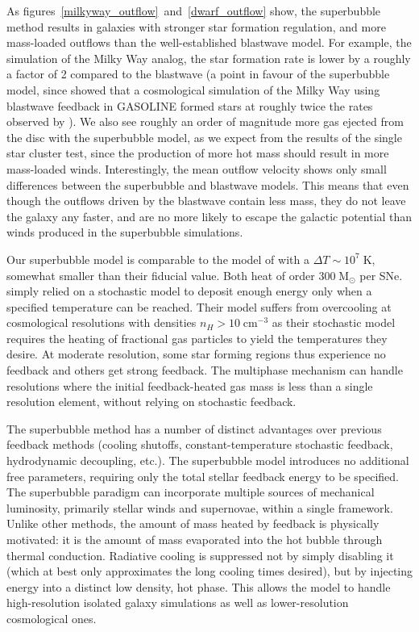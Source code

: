 As figures~\ref{milkyway_outflow}~and~\ref{dwarf_outflow} show, the superbubble
method results in galaxies with stronger star formation regulation, and
more mass-loaded outflows than the well-established blastwave model.  
For example, the simulation of the Milky Way analog, the star
formation rate is lower by a roughly a factor of 2 compared to the blastwave (a
point in favour of the superbubble model, since \citet{Scannapieco2012} showed
that a cosmological simulation of the Milky Way using blastwave feedback in
{\sc GASOLINE} formed stars at roughly twice the rates observed by
\citet{Guo2011}).  We also see roughly an order of magnitude more gas ejected
from the disc with the superbubble model, as we expect from the results of the
single star cluster test, since the production of more hot mass should result in
more mass-loaded winds.  Interestingly, the mean outflow velocity shows only
small differences between the superbubble and blastwave models.  This means that
even though the outflows driven by the blastwave contain less mass, they do not
leave the galaxy any faster, and are no more likely to escape the galactic
potential than winds produced in the superbubble simulations.

Our superbubble model is comparable to the model of \citet{DallaVecchia2012}
with a $\Delta T \sim 10^{7}\;\mathrm{K}$, somewhat smaller than their fiducial
value.  Both heat of order $300\;\mathrm{M_\odot}$ per SNe.
\citet{DallaVecchia2012} simply relied on a stochastic model to deposit enough
energy only when a specified temperature can be reached.   Their model suffers
from overcooling at cosmological resolutions with densities $n_H >
10\;\mathrm{cm^{-3}}$ as their stochastic model requires the heating of
fractional gas particles to yield the temperatures they desire.   At moderate
resolution, some star forming regions thus experience no feedback and others get
strong feedback.  The multiphase mechanism can handle resolutions where the
initial feedback-heated gas mass is less than a single resolution element,
without relying on stochastic feedback.

The superbubble method has a number of distinct advantages over previous feedback
methods (cooling shutoffs, constant-temperature stochastic feedback,
hydrodynamic decoupling, etc.).  The superbubble model introduces no additional
free parameters, requiring only the total stellar feedback energy to be
specified.  The superbubble paradigm can incorporate multiple sources of
mechanical luminosity, primarily stellar winds and supernovae, within a single
framework.  Unlike other methods, the amount of mass heated by feedback is
physically motivated: it is the amount of mass evaporated into the hot bubble
through thermal conduction.  Radiative cooling is suppressed not by simply
disabling it (which at best only approximates the long cooling times desired),
but by injecting energy into a distinct low density, hot phase.  This allows the
model to handle high-resolution isolated galaxy simulations as well as
lower-resolution cosmological ones.  


